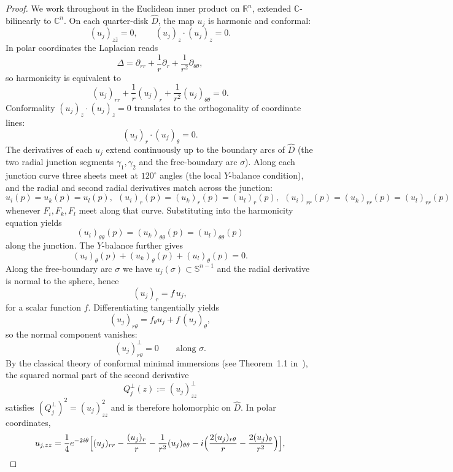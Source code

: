 \documentclass[11pt]{amsart}
\numberwithin{equation}{section}
\theoremstyle{theorem}
\theoremstyle{definition}
\numberwithin{equation}{section}
\begin{document}
\begin{proof}
We work throughout in the Euclidean inner product on $\mathbb{R}^n$, extended $\mathbb{C}$-bilinearly to $\mathbb{C}^n$. On each quarter-disk $\hat{D}$, the map $u_j$ is harmonic and conformal:
\[
(u_j)_{z\bar{z}}=0, \qquad (u_j)_z\cdot(u_j)_z=0.
\]
In polar coordinates the Laplacian reads
\[
\Delta = \partial_{rr} + \frac{1}{r}\partial_r + \frac{1}{r^2}\partial_{\theta\theta},
\]
so harmonicity is equivalent to
\[
(u_j)_{rr} + \frac{1}{r}(u_j)_r + \frac{1}{r^2}(u_j)_{\theta\theta} = 0.
\]
Conformality $(u_j)_z\cdot(u_j)_z=0$ translates to the orthogonality of coordinate lines:
\[
(u_j)_r\cdot(u_j)_\theta=0.
\]
The derivatives of each $u_j$ extend continuously up to the boundary arcs of $\hat{D}$ (the two radial junction segments $\gamma_1,\gamma_2$ and the free-boundary arc $\sigma$). Along each junction curve three sheets meet at $120^\circ$ angles (the local $Y$-balance condition), and the radial and second radial derivatives match across the junction:
\begin{equation}
\label{eq:matching-r}
u_i(p)=u_k(p)=u_l(p),\ \
(u_i)_r(p)=(u_k)_r(p)=(u_l)_r(p),\ \
(u_i)_{rr}(p)=(u_k)_{rr}(p)=(u_l)_{rr}(p)
\end{equation}
whenever $F_i,F_k,F_l$ meet along that curve. Substituting into the harmonicity equation yields
\begin{equation}
\label{eq:matching-theta2}
(u_i)_{\theta\theta}(p)=(u_k)_{\theta\theta}(p)=(u_l)_{\theta\theta}(p)
\end{equation}
along the junction. The $Y$-balance further gives
\begin{equation}
\label{eq:Y-balance}
(u_i)_\theta(p)+(u_k)_\theta(p)+(u_l)_\theta(p)=0.
\end{equation}
Along the free-boundary arc $\sigma$ we have $u_j(\sigma)\subset\mathbb{S}^{n-1}$ and the radial derivative is normal to the sphere, hence
\[
(u_j)_r=f\,u_j,
\]
for a scalar function $f$. Differentiating tangentially yields
\[
(u_j)_{r\theta}=f_\theta u_j + f\,(u_j)_\theta,
\]
so the normal component vanishes:
\begin{equation}
\label{eq:perp}
(u_j)_{r\theta}^\perp=0\qquad\text{along }\sigma.
\end{equation}
By the classical theory of conformal minimal immersions (see Theorem~1.1 in~\cite{matinpour2025cone}), the squared normal part of the second derivative
\[
Q_j^\perp(z):=(u_j)_{zz}^\perp
\]
satisfies $(Q_j^\perp)^2=(u_j)_{zz}^2$ and is therefore holomorphic on $\hat{D}$. In polar coordinates,
\[
u_{j,zz}=\frac14 e^{-2i\theta}\Bigl[(u_j)_{rr}-\frac{(u_j)_r}{r}-\frac1{r^2}(u_j)_{\theta\theta}-i\Bigl(\frac{2(u_j)_{r\theta}}{r}-\frac{2(u_j)_\theta}{r^2}\Bigr)\Bigr],
\]
\end{proof}
\end{document}
